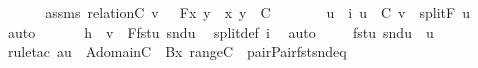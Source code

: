 \begin{isabellebody}
%
\isadelimproof
%
\endisadelimproof
%
\isatagproof
{}\isamarkupfalse%
\ {\isacharminus}{\kern0pt}\ \isanewline
\ \ \isamarkupfalse%
\ assms{\isacharcolon}{\kern0pt}\ {\isachardoublequoteopen}relation{\isacharparenleft}{\kern0pt}C{\isacharparenright}{\kern0pt}{\isachardoublequoteclose}\ {\isachardoublequoteopen}v\ {\isasymin}\ {\isacharbraceleft}{\kern0pt}\ F{\isacharparenleft}{\kern0pt}x{\isacharcomma}{\kern0pt}\ y{\isacharparenright}{\kern0pt}\ {\isachardot}{\kern0pt}\ {\isacharless}{\kern0pt}x{\isacharcomma}{\kern0pt}\ y{\isachargreater}{\kern0pt}\ {\isasymin}\ C\ {\isacharbraceright}{\kern0pt}{\isachardoublequoteclose}\ \isanewline
\ \ \isamarkupfalse%
\ \isamarkupfalse%
\ u\ \ i{\isacharcolon}{\kern0pt}\ {\isachardoublequoteopen}u\ {\isasymin}\ C{\isachardoublequoteclose}\ {\isachardoublequoteopen}v\ {\isacharequal}{\kern0pt}\ split{\isacharparenleft}{\kern0pt}F{\isacharcomma}{\kern0pt}\ u{\isacharparenright}{\kern0pt}{\isachardoublequoteclose}\ \isamarkupfalse%
\ auto\ \isanewline
\ \ \isamarkupfalse%
\ \isamarkupfalse%
\ h\ {\isacharcolon}{\kern0pt}\ {\isachardoublequoteopen}v\ {\isacharequal}{\kern0pt}\ F{\isacharparenleft}{\kern0pt}fst{\isacharparenleft}{\kern0pt}u{\isacharparenright}{\kern0pt}{\isacharcomma}{\kern0pt}\ snd{\isacharparenleft}{\kern0pt}u{\isacharparenright}{\kern0pt}{\isacharparenright}{\kern0pt}{\isachardoublequoteclose}\ \isamarkupfalse%
\ split{\isacharunderscore}{\kern0pt}def\ i\ \isamarkupfalse%
\ auto\ \isanewline
\ \ \isamarkupfalse%
\ {\isachardoublequoteopen}{\isacharless}{\kern0pt}fst{\isacharparenleft}{\kern0pt}u{\isacharparenright}{\kern0pt}{\isacharcomma}{\kern0pt}\ snd{\isacharparenleft}{\kern0pt}u{\isacharparenright}{\kern0pt}{\isachargreater}{\kern0pt}\ {\isacharequal}{\kern0pt}\ u{\isachardoublequoteclose}\ \isanewline
\ \ \ \ \isamarkupfalse%
\ {\isacharparenleft}{\kern0pt}rule{\isacharunderscore}{\kern0pt}tac\ a{\isacharequal}{\kern0pt}u\ \ A{\isacharequal}{\kern0pt}{\isachardoublequoteopen}domain{\isacharparenleft}{\kern0pt}C{\isacharparenright}{\kern0pt}{\isachardoublequoteclose}\ \ B{\isacharequal}{\kern0pt}{\isachardoublequoteopen}{\isasymlambda}x{\isachardot}{\kern0pt}\ range{\isacharparenleft}{\kern0pt}C{\isacharparenright}{\kern0pt}{\isachardoublequoteclose}\ \ pair{\isachardot}{\kern0pt}Pair{\isacharunderscore}{\kern0pt}fst{\isacharunderscore}{\kern0pt}snd{\isacharunderscore}{\kern0pt}eq{\isacharparenright}{\kern0pt}\isanewline

\end{isabellebody}
